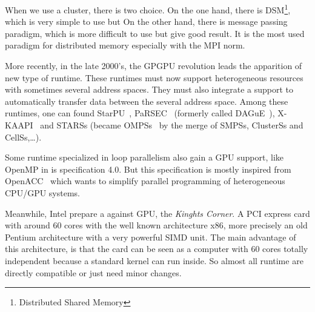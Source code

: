 When we use a cluster, there is two choice.
%
On the one hand, there is DSM\footnote{Distributed Shared Memory}, which is very simple to use but
%
On the other hand, there is message passing paradigm, which is more difficult to use but give good result.
%
It is the most used paradigm for distributed memory especially with the MPI norm.
%

More recently, in the late 2000's, the GPGPU revolution leads the apparition of new type of runtime.
%
These runtimes must now support heterogeneous resources with sometimes several address spaces.
%
They must also integrate a support to automatically transfer data between the several address space.
%
Among these runtimes, one can found StarPU~\cite{ATNW2011,Aug2011}, PaRSEC~\cite{PaRSEC} (formerly called DAGuE~\cite{DAGuE2012}), X-KAAPI~\cite{X-KAAPI} and STARSs (became OMPSs~\cite{OMPSs} by the merge of SMPSs, ClusterSs and CellSs,\dots).

Some runtime specialized in loop parallelism also gain a GPU support, like OpenMP in is specification 4.0.
%
But this specification is mostly inspired from OpenACC~\cite{OpenACC} which wants to simplify parallel programming of heterogeneous CPU/GPU systems.

Meanwhile, Intel prepare a against GPU, the {\em Kinghts Corner}.
%
A PCI express card with around 60 cores with the well known architecture x86, more precisely an old Pentium architecture with a very powerful SIMD unit.
%
The main advantage of this architecture, is that the card can be seen as a computer with 60 cores totally independent because a standard kernel can run inside.
%
So almost all runtime are directly compatible or just need minor changes.
